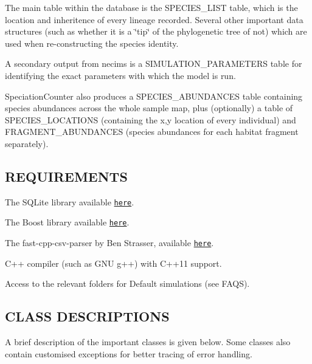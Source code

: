 \begin{DoxyItemize}
\item The main table within the database is the S\+P\+E\+C\+I\+E\+S\+\_\+\+L\+I\+ST table, which is the location and inheritence of every lineage recorded. Several other important data structures (such as whether it is a \char`\"{}tip\char`\"{} of the phylogenetic tree of not) which are used when re-\/constructing the species identity.
\item A secondary output from necims is a S\+I\+M\+U\+L\+A\+T\+I\+O\+N\+\_\+\+P\+A\+R\+A\+M\+E\+T\+E\+RS table for identifying the exact parameters with which the model is run.
\item Speciation\+Counter also produces a S\+P\+E\+C\+I\+E\+S\+\_\+\+A\+B\+U\+N\+D\+A\+N\+C\+ES table containing species abundances across the whole sample map, plus (optionally) a table of S\+P\+E\+C\+I\+E\+S\+\_\+\+L\+O\+C\+A\+T\+I\+O\+NS (containing the x,y location of every individual) and F\+R\+A\+G\+M\+E\+N\+T\+\_\+\+A\+B\+U\+N\+D\+A\+N\+C\+ES (species abundances for each habitat fragment separately).
\end{DoxyItemize}

\subsection*{R\+E\+Q\+U\+I\+R\+E\+M\+E\+N\+TS}


\begin{DoxyItemize}
\item The S\+Q\+Lite library available \href{https://www.sqlite.org/download.html}{\tt here}.
\item The Boost library available \href{http://www.boost.org}{\tt here}.
\item The fast-\/cpp-\/csv-\/parser by Ben Strasser, available \href{https://github.com/ben-strasser/fast-cpp-csv-parser}{\tt here}.
\item C++ compiler (such as G\+NU g++) with C++11 support.
\item Access to the relevant folders for Default simulations (see F\+A\+QS).
\end{DoxyItemize}

\subsection*{C\+L\+A\+SS D\+E\+S\+C\+R\+I\+P\+T\+I\+O\+NS}

A brief description of the important classes is given below. Some classes also contain customised exceptions for better tracing of error handling.


